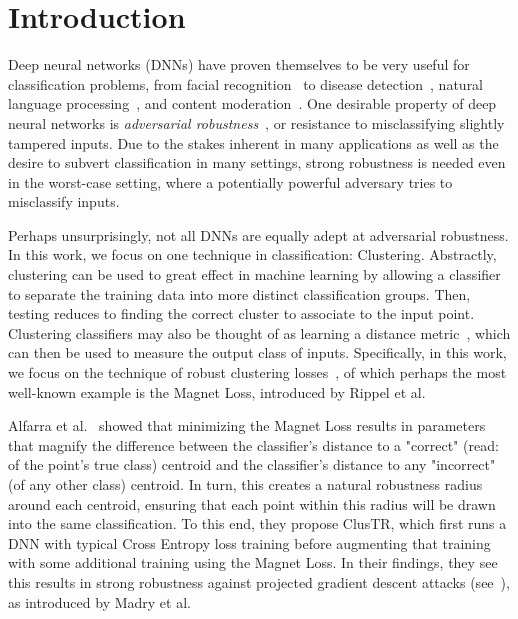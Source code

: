 \section{Introduction}

Deep neural networks (DNNs) have proven themselves to be very useful for classification problems, from facial recognition~\cite{Sun2015FaceRecog} to disease detection~\cite{Boulent2019PlantDisease}, natural language processing~\cite{Lai2015NLP}, and content moderation~\cite{Pavlopoulos2017Moderation}. One desirable property of deep neural networks is \emph{adversarial robustness}~\cite{Szegedy2013Robust}, or resistance to misclassifying slightly tampered inputs. Due to the stakes inherent in many applications as well as the desire to subvert classification in many settings, strong robustness is needed even in the worst-case setting, where a potentially powerful adversary tries to misclassify inputs.

Perhaps unsurprisingly, not all DNNs are equally adept at adversarial robustness. In this work, we focus on one technique in classification: Clustering. Abstractly, clustering can be used to great effect in machine learning by allowing a classifier to separate the training data into more distinct classification groups. Then, testing reduces to finding the correct cluster to associate to the input point. Clustering classifiers may also be thought of as learning a distance metric~\cite{Weinberger2009Distance}, which can then be used to measure the output class of inputs. Specifically, in this work, we focus on the technique of robust clustering losses~\cite{Alfarra2020ClusTR}, of which perhaps the most well-known example is the Magnet Loss, introduced by Rippel et al.~\cite{Rippel2015Magnet}


Alfarra et al.~\cite{Alfarra2020ClusTR} showed that minimizing the Magnet Loss results in parameters that magnify the difference between the classifier's distance to a "correct" (read: of the point's true class) centroid and the classifier's distance to any "incorrect" (of any other class) centroid. In turn, this creates a natural robustness radius around each centroid, ensuring that each point within this radius will be drawn into the same classification. To this end, they propose ClusTR, which first runs a DNN with typical Cross Entropy loss training before augmenting that training with some additional training using the Magnet Loss. In their findings, they see this results in strong robustness against projected gradient descent attacks (see~\cite[Table 1]{Alfarra2020ClusTR}), as introduced by Madry et al.~\cite{Madry2017Robust}

